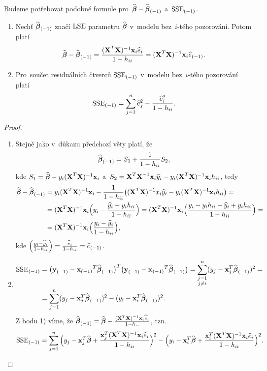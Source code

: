 Budeme potřebovat podobné formule pro~$\widehat{\boldsymbol{\beta}}-\widehat{\boldsymbol{\beta}}_{(-1)}$ a~${\mathrm{SSE}_{(-1)}}$.

\begin{theorem}
	\begin{enumerate}[1)]
		\item Nechť ${\widehat{\boldsymbol{\beta}}_{(-1)}}$ značí $\mathrm{LSE}$ parametru $\widehat{\boldsymbol{\beta}}$ v~modelu bez~$i$-tého pozorování. Potom platí 
	$$ \widehat{\boldsymbol{\beta}}-{\widehat{\boldsymbol{\beta}}_{(-1)}}=\frac{(\textbf{X}^T\textbf{X})^{-1}\textbf{x}_i\widehat{e}_i}{1-h_{ii}}=(\textbf{X}^T\textbf{X})^{-1}\textbf{x}_i{\widehat{e}_{(-1)}}.$$
	\item Pro~součet residuálních čtverců ${\mathrm{SSE}_{(-1)}}$ v~modelu bez~$i$-tého pozorování platí
	$${\mathrm{SSE}_{(-1)}}=\sum\limits_{j=1}^{n} \widehat{e}_j^2-\frac{\widehat{e}_i^2}{1-h_{ii}}.$$
	\end{enumerate}

\begin{proof}
	\begin{enumerate}[1)]
		\item Stejně jako v~důkazu předchozí věty platí, že 
		$$ {\widehat{\boldsymbol{\beta}}_{(-1)}}=S_1+\frac{1}{1-h_{ii}}S_2,$$
		kde $S_1=\widehat{\boldsymbol{\beta}}-y_i(\textbf{X}^T\textbf{X})^{-1}\textbf{x}_i$ a~$S_2=\textbf{X}^T\textbf{X}^{-1}\textbf{x}_i\widehat{y}_i-y_i(\textbf{X}^T\textbf{X})^{-1} \textbf{x}_ih_{ii}$, tedy
		\[
		\begin{split}
		\widehat{\boldsymbol{\beta}}-{\widehat{\boldsymbol{\beta}}_{(-1)}}&=y_i(\textbf{X}^T\textbf{X})^{-1}\textbf{x}_i-\frac{1}{1-h_{ii}}\big((\textbf{X}^T\textbf{X})^{-1} x_i\widehat{y}_i-y_i(\textbf{X}^T\textbf{X})^{-1} \textbf{x}_ih_{ii}\big)=\\&=(\textbf{X}^T\textbf{X})^{-1} \textbf{x}_i\Big(y_i-\frac{\widehat{y}_i-y_ih_{ii}}{1-h_{ii}}\Big)=(\textbf{X}^T\textbf{X})^{-1} \textbf{x}_i\Big(\frac{y_i-y_ih_{ii}-\widehat{y}_i+y_ih_{ii}}{1-h_{ii}}\Big)=\\&=(\textbf{X}^T\textbf{X})^{-1} \textbf{x}_i\Big(\frac{y_i-\widehat{y}_i}{1-h_{ii}}\Big),
		\end{split}
		\] 
		kde $\Big(\frac{y_i-\widehat{y}_i}{1-h_{ii}}\Big)=\frac{\widehat{e}_i}{1-h_{ii}}={\widehat{e}_{(-1)}}$.
		\item \[
		\begin{split}
		{\mathrm{SSE}_{(-1)}}&=\big({\textbf{y}_{(-1)}}-{\textbf{x}_{(-1)}}^T{\widehat{\boldsymbol{\beta}}_{(-1)}}\big)^T\big({\textbf{y}_{(-1)}}-{\textbf{x}_{(-1)}}^T{\widehat{\boldsymbol{\beta}}_{(-1)}}\big)=\sum_{\substack{j=1\\j\neq i}}^{n}(y_j-\textbf{x}_j^T{\widehat{\boldsymbol{\beta}}_{(-1)}})^2=\\&=\sum\limits_{j=1}^{n} (y_j-\textbf{x}_j^T{\widehat{\boldsymbol{\beta}}_{(-1)}})^2-(y_i-\textbf{x}_i^T{\widehat{\boldsymbol{\beta}}_{(-1)}})^2.
		\end{split}
		\]
		Z bodu 1) víme, že ${\widehat{\boldsymbol{\beta}}_{(-1)}}=\widehat{\boldsymbol{\beta}}-\frac{(\textbf{X}^T\textbf{X})^{-1} \textbf{x}_i\widehat{e}_i}{1-h_{ii}}$, tzn.
		$$ {\mathrm{SSE}_{(-1)}}=\sum\limits_{j=1}^{n}\Big(y_j-\textbf{x}_j^T\widehat{\boldsymbol{\beta}}+\frac{\textbf{x}_j^T(\textbf{X}^T\textbf{X})^{-1} \textbf{x}_i\widehat{e}_i}{1-h_{ii}}\Big)^2-\Big(y_i-\textbf{x}_i^T\widehat{\boldsymbol{\beta}}+\frac{\textbf{x}_i^T(\textbf{X}^T\textbf{X})^{-1} \textbf{x}_i\widehat{e}_i}{1-h_{ii}}\Big)^2.$$

\end{enumerate}
\end{proof}
\end{theorem}
